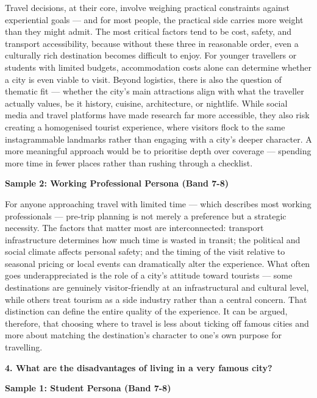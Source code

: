 Travel decisions, at their core, involve weighing practical constraints against experiential goals — and for most people, the practical side carries more weight than they might admit. The most critical factors tend to be cost, safety, and transport accessibility, because without these three in reasonable order, even a culturally rich destination becomes difficult to enjoy. For younger travellers or students with limited budgets, accommodation costs alone can determine whether a city is even viable to visit. Beyond logistics, there is also the question of thematic fit — whether the city's main attractions align with what the traveller actually values, be it history, cuisine, architecture, or nightlife. While social media and travel platforms have made research far more accessible, they also risk creating a homogenised tourist experience, where visitors flock to the same instagrammable landmarks rather than engaging with a city's deeper character. A more meaningful approach would be to prioritise depth over coverage — spending more time in fewer places rather than rushing through a checklist.

\textbf{Sample 2: Working Professional Persona (Band 7-8)}

For anyone approaching travel with limited time — which describes most working professionals — pre-trip planning is not merely a preference but a strategic necessity. The factors that matter most are interconnected: transport infrastructure determines how much time is wasted in transit; the political and social climate affects personal safety; and the timing of the visit relative to seasonal pricing or local events can dramatically alter the experience. What often goes underappreciated is the role of a city's attitude toward tourists — some destinations are genuinely visitor-friendly at an infrastructural and cultural level, while others treat tourism as a side industry rather than a central concern. That distinction can define the entire quality of the experience. It can be argued, therefore, that choosing where to travel is less about ticking off famous cities and more about matching the destination's character to one's own purpose for travelling.

\separator

\begin{ieltsquestion}
\textbf{4. What are the disadvantages of living in a very famous city?}
\end{ieltsquestion}
\textbf{Sample 1: Student Persona (Band 7-8)}

